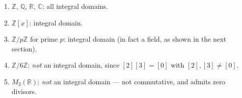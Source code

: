 \begin{remark*}[Flash]
\end{remark*}


\begin{example}
\begin{enumerate}[label=(\roman*)]
  \item $\mathbb{Z}$, $\mathbb{Q}$, $\mathbb{R}$, $\mathbb{C}$:
        all integral domains.
  \item $\mathbb{Z}[x]$: integral domain.
  \item $\mathbb{Z}/p\mathbb{Z}$ for prime $p$: integral domain
        (in fact a field, as shown in the next section).
  \item $\mathbb{Z}/6\mathbb{Z}$: \emph{not} an integral domain,
        since $[2][3] = [0]$ with $[2],[3] \neq [0]$.
  \item $M_2(\mathbb{R})$: \emph{not} an integral domain ---
        not commutative, and admits zero divisors.
\end{enumerate}
\end{example}
